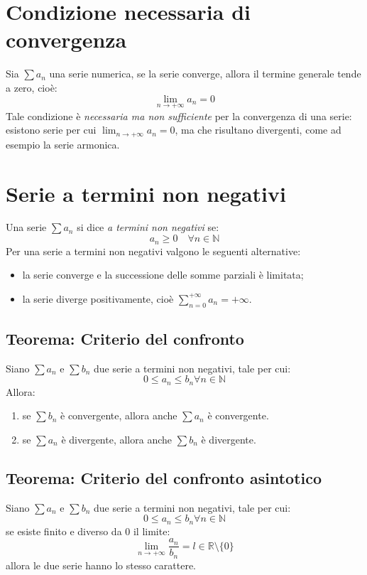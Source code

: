 \documentclass[a4paper,12pt,openright]{book}
\begin{document}
	\section{Condizione necessaria di convergenza}
	Sia $\sum a_n$ una serie numerica, se la serie converge, allora il termine generale tende a zero, cioè:
	\[\lim_{n \to +\infty} a_n = 0\]
	Tale condizione è \emph{necessaria ma non sufficiente} per la convergenza di una serie: esistono serie per cui $\lim_{n \to +\infty} a_n = 0$, ma che risultano divergenti, come ad esempio la serie armonica.
	
	\newpage
	
	\section{Serie a termini non negativi}
	Una serie $\sum a_n$ si dice \emph{a termini non negativi} se:
	\[a_n \geq 0 \quad \forall n \in \mathbb{N}\]
	Per una serie a termini non negativi valgono le seguenti alternative:
	\begin{itemize}
		\item la serie converge e la successione delle somme parziali è limitata;
		\item la serie diverge positivamente, cioè $\displaystyle \sum_{n=0}^{+\infty} a_n = +\infty$.
	\end{itemize}
	
	\subsection{Teorema: Criterio del confronto}
	Siano $\sum a_n$ e $\sum b_n$ due serie a termini non negativi, tale per cui:
	\[0 \leq a_n \leq b_n \forall n \in \mathbb{N}\]
	Allora:
	\begin{enumerate}[label=\alph*)]
		\item se $\sum b_n$ è convergente, allora anche $\sum a_n$ è convergente.
		\item se $\sum a_n$ è divergente, allora anche $\sum b_n$ è divergente.
	\end{enumerate}
	
	\subsection{Teorema: Criterio del confronto asintotico}
	Siano $\sum a_n$ e $\sum b_n$ due serie a termini non negativi, tale per cui:
	\[0 \leq a_n \leq b_n \forall n \in \mathbb{N}\]
	se esiste finito e diverso da 0 il limite:
	\[\lim_{n \to +\infty} \frac{a_n}{b_n} = l \in \mathbb{R} \setminus \{0\}\]
	allora le due serie hanno lo stesso carattere.
	
\end{document}
